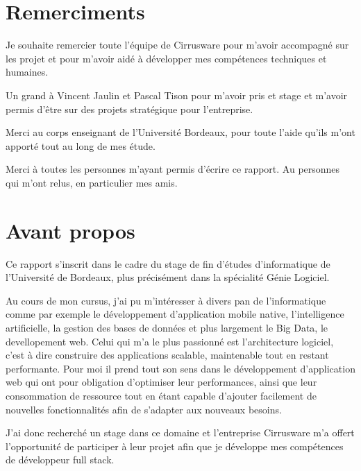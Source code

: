 \section{Remerciments}
Je souhaite remercier toute l'équipe de Cirrusware pour m'avoir accompagné sur les projet et pour m'avoir aidé à développer mes compétences techniques et humaines.

Un grand à Vincent Jaulin et Pascal Tison pour m'avoir pris et stage et m'avoir permis d'être sur des projets stratégique pour l'entreprise.

Merci au corps enseignant de l'Université Bordeaux, pour toute l'aide qu'ils m'ont apporté tout au long de mes étude.

Merci à toutes les personnes m'ayant permis d'écrire ce rapport. Au personnes qui m'ont relus, en particulier mes amis. 





\newpage
\section{Avant propos}
Ce rapport s'inscrit dans le cadre du stage de fin d'études d'informatique de l'Université de Bordeaux, plus précisément dans la spécialité Génie Logiciel.

Au cours de mon cursus, j'ai pu m'intéresser à divers pan de l'informatique comme par exemple le développement d'application mobile native, l'intelligence artificielle, la gestion des bases de données et plus largement le Big Data, le devellopement web. Celui qui m'a le plus passionné est l'architecture logiciel, c'est à dire construire des applications scalable, maintenable tout en restant performante. Pour moi il prend tout son sens dans le développement d'application web qui ont pour obligation d'optimiser leur performances, ainsi que leur consommation de ressource tout en étant capable d'ajouter facilement de nouvelles fonctionnalités afin de s'adapter aux nouveaux besoins.

J'ai donc recherché un stage dans ce domaine et l'entreprise Cirrusware m'a offert l'opportunité de participer à leur projet afin que je développe mes compétences de développeur full stack. 





